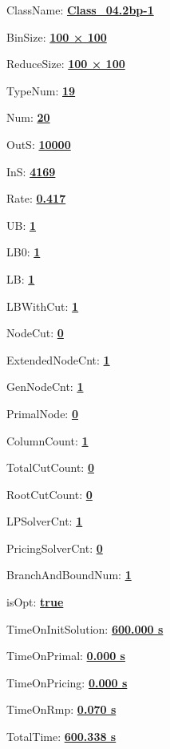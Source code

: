 \documentclass[11pt]{article}
\begin{document}
\pagestyle{empty}


ClassName: \underline{\textbf{Class_04.2bp-1}}
\par
BinSize: \underline{\textbf{100 × 100}}
\par
ReduceSize: \underline{\textbf{100 × 100}}
\par
TypeNum: \underline{\textbf{19}}
\par
Num: \underline{\textbf{20}}
\par
OutS: \underline{\textbf{10000}}
\par
InS: \underline{\textbf{4169}}
\par
Rate: \underline{\textbf{0.417}}
\par
UB: \underline{\textbf{1}}
\par
LB0: \underline{\textbf{1}}
\par
LB: \underline{\textbf{1}}
\par
LBWithCut: \underline{\textbf{1}}
\par
NodeCut: \underline{\textbf{0}}
\par
ExtendedNodeCnt: \underline{\textbf{1}}
\par
GenNodeCnt: \underline{\textbf{1}}
\par
PrimalNode: \underline{\textbf{0}}
\par
ColumnCount: \underline{\textbf{1}}
\par
TotalCutCount: \underline{\textbf{0}}
\par
RootCutCount: \underline{\textbf{0}}
\par
LPSolverCnt: \underline{\textbf{1}}
\par
PricingSolverCnt: \underline{\textbf{0}}
\par
BranchAndBoundNum: \underline{\textbf{1}}
\par
isOpt: \underline{\textbf{true}}
\par
TimeOnInitSolution: \underline{\textbf{600.000 s}}
\par
TimeOnPrimal: \underline{\textbf{0.000 s}}
\par
TimeOnPricing: \underline{\textbf{0.000 s}}
\par
TimeOnRmp: \underline{\textbf{0.070 s}}
\par
TotalTime: \underline{\textbf{600.338 s}}
\par
\newpage
\end{document}
